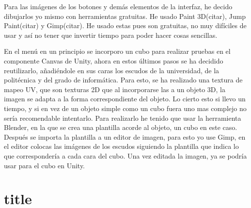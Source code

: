 Para las imágenes de los botones y demás elementos de la interfaz, he decido dibujarlos yo mismo con herramientas gratuitas. He usado Paint 3D(citar), Jump Paint(citar) y Gimp(citar). He usado estas pues son gratuitas, no muy difíciles de usar y así no tener que invertir tiempo para poder hacer cosas sencillas.



En el menú en un principio se incorporo un cubo para realizar pruebas en el componente Canvas de Unity, ahora en estos últimos pasos se ha decidido reutilizarlo, añadiéndole en sus caras los escudos de la universidad, de la politécnica y del grado de informática. Para esto, se ha realizado una textura de mapeo UV, que son texturas 2D que al incorporarse las a un objeto 3D, la imagen se adapta a la forma correspondiente del objeto. Lo cierto esto si llevo un tiempo, y si en vez de un objeto simple como un cubo fuera uno mas complejo no sería recomendable intentarlo. Para realizarlo he tenido que usar la herramienta Blender, en la que se crea una plantilla acorde al objeto, un cubo en este caso. Después se importa la plantilla a un editor de imagen, para esto yo use Gimp, en el editor colocas las imágenes de los escudos siguiendo la plantilla que indica lo que correspondería a cada cara del cubo. Una vez editada la imagen, ya se podría usar para el cubo en Unity.






\section{title}
